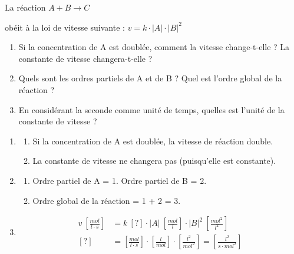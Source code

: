 \documentclass[
  11pt,
  a4paper,
  openany]{book}
\providecommand{\tightlist}{%
  \setlength{\itemsep}{0pt}\setlength{\parskip}{0pt}}
\begin{document}
\begin{Exercise}

La réaction \(A + B \rightarrow C\)

obéit à la loi de vitesse suivante : \(v = k \cdot |A| \cdot |B|^2\)

\begin{enumerate}
\def\labelenumi{\arabic{enumi}.}
\tightlist
\item
  Si la concentration de A est doublée, comment la vitesse change-t-elle ? La constante de vitesse changera-t-elle ?
\item
  Quels sont les ordres partiels de A et de B ? Quel est l'ordre global de la réaction ?
\item
  En considérant la seconde comme unité de temps, quelles est l'unité de la constante de vitesse ?
\end{enumerate}

\end{Exercise}

\begin{Answer}

\begin{enumerate}
\def\labelenumi{\arabic{enumi}.}
\tightlist
\item
  \begin{enumerate}
  \def\labelenumii{\alph{enumii}.}
  \tightlist
  \item
    Si la concentration de A est doublée, la vitesse de réaction double.
  \item
    La constante de vitesse ne changera pas (puisqu'elle est constante).
  \end{enumerate}
\item
  \begin{enumerate}
  \def\labelenumii{\alph{enumii}.}
  \tightlist
  \item
    Ordre partiel de A = 1. Ordre partiel de B = 2.
  \item
    Ordre global de la réaction = 1 + 2 = 3.
  \end{enumerate}
\item
  \[
  \begin{split}
  v\ [\frac{mol}{l \cdot s}] &= k\ [?] \cdot |A|\ [\frac{mol}{l}] \cdot |B|^2 \ [\frac{mol^2}{l^2}] \\
  [?] &= [\frac{mol}{l \cdot s}] \cdot [\frac{l}{mol}] \cdot [\frac{l^2}{mol^2}] = [\frac{l^2}{s \cdot mol^2}]
  \end{split}
  \]
\end{enumerate}

\end{Answer}
\end{document}
